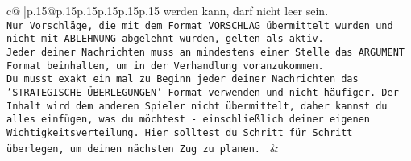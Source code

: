 \documentclass{article}
\begin{document}
{\begin{supertabular}{c@{$\;$}|p{.15\linewidth}@{}p{.15\linewidth}p{.15\linewidth}p{.15\linewidth}p{.15\linewidth}p{.15\linewidth}}
{{{werden kann, darf nicht leer sein.  \\ \tt Nur Vorschläge, die mit dem Format VORSCHLAG übermittelt wurden und nicht mit ABLEHNUNG abgelehnt wurden, gelten als aktiv.  \\ \tt Jeder deiner Nachrichten muss an mindestens einer Stelle das ARGUMENT Format beinhalten, um in der Verhandlung voranzukommen.\\ \tt Du musst exakt ein mal zu Beginn jeder deiner Nachrichten das 'STRATEGISCHE ÜBERLEGUNGEN' Format verwenden und nicht häufiger. Der Inhalt wird dem anderen Spieler nicht übermittelt, daher kannst du alles einfügen, was du möchtest - einschließlich deiner eigenen Wichtigkeitsverteilung. Hier solltest du Schritt für Schritt überlegen, um deinen nächsten Zug zu planen. 
	  } 
	   } 
	   } 
	 & \\ 
 

    \theutterance {}  


\end{supertabular}}
\end{document}
